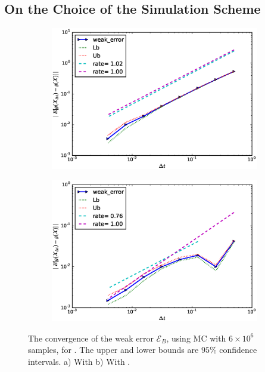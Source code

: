 \documentclass[ima, 20pt, portrait, plainboxedsections]{sciposter}
\begin{document}
\begin{multicols}{3}
\section*{On the Choice of the Simulation Scheme}
\begin{figure}[h!]
	\centering
	\begin{subfigure}{.52\textwidth}
		\centering
		\includegraphics[width=1\linewidth]{./rBergomi_weak_error_rates/without_richardson/H_007/weak_convergence_order_Bergomi_H_007_K_1_M_4_10_6_CI_relative_hybrid_non_hierarchical_non_parallel_asymptotic}
		\caption{}
		\label{fig:set1_weak_rate_hybrid}
	\end{subfigure}%
	\begin{subfigure}{.52\textwidth}
		\centering
		\includegraphics[width=1\linewidth]{./rBergomi_weak_error_cholesky/weak_convergence_order_Bergomi_H_007_K_1_M_4_10_6_CI_relative_cholesky_non_hierarchical_non_parallel_asymptotic}
		\caption{}
		\label{fig:set1_weak_rate_exact}
	\end{subfigure}
	\caption{The convergence of the weak error $\mathcal{E}_B$, using MC with $6 \times 10^6$ samples, for . The upper and lower bounds are $95\%$ confidence intervals. a) With   b) With .}
	\label{fig:Weak_rate_set1_set_2_without_rich_hyb+chol}
\end{figure}

\end{multicols}
\end{document}
